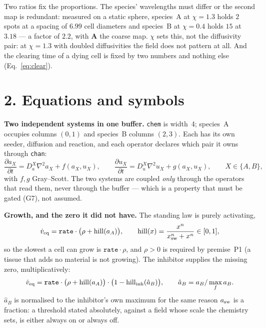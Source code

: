 \documentclass[10pt,a4paper]{article}
\newcommand{\code}[1]{\texttt{#1}}
\begin{document}
Two ratios fix the proportions. The species' wavelengths must differ or the second map is
redundant: measured on a static sphere, species~A at $\chi=1.3$ holds $2$ spots at a spacing of
$6.99$ cell diameters and species~B at $\chi=0.4$ holds $15$ at $3.18$ --- a factor of $2.2$, with
\textbf{A} the coarse map. $\chi$ sets this, not the diffusivity pair: at $\chi=1.3$ with doubled
diffusivities the field does not pattern at all. And the clearing time of a dying cell is fixed by
two numbers and nothing else (Eq.~\eqref{eq:clear}).

\section*{2.\; Equations and symbols}

\textbf{Two independent systems in one buffer.} \code{chem} is width~4; species~A occupies columns
$(0,1)$ and species~B columns $(2,3)$. Each has its own seeder, diffusion and reaction, and each
operator declares which pair it owns through \code{chan}:
%
\begin{equation}
\frac{\partial a_X}{\partial t}=D^X_a\nabla^2 a_X + f(a_X,u_X),\qquad
\frac{\partial u_X}{\partial t}=D^X_u\nabla^2 u_X + g(a_X,u_X),\qquad X\in\{A,B\},
\label{eq:two}
\end{equation}
%
with $f,g$ Gray--Scott. The two systems are coupled \emph{only} through the operators that read
them, never through the buffer --- which is a property that must be gated (G7), not assumed.

\textbf{Growth, and the zero it did not have.} The standing law is purely activating,
%
\begin{equation}
\dot v_{\rm eq}=\texttt{rate}\cdot\bigl(\rho+\mathrm{hill}(a_A)\bigr),\qquad
\mathrm{hill}(x)=\frac{x^{n}}{x_{\rm sw}^{n}+x^{n}}\in[0,1],
\label{eq:growth}
\end{equation}
%
so the slowest a cell can grow is $\texttt{rate}\cdot\rho$, and $\rho>0$ is required by premise~P1
(a tissue that adds no material is not growing). The inhibitor supplies the missing zero,
multiplicatively:
%
\begin{equation}
\dot v_{\rm eq}=\texttt{rate}\cdot\bigl(\rho+\mathrm{hill}(a_A)\bigr)\cdot
\bigl(1-\mathrm{hill}_{\rm inh}(\hat a_B)\bigr),\qquad \hat a_B=a_B/\max_f a_B .
\label{eq:inhib}
\end{equation}
%
$\hat a_B$ is normalised to the inhibitor's own maximum for the same reason $a_{\rm sw}$ is a
fraction: a threshold stated absolutely, against a field whose scale the chemistry sets, is either
always on or always off.
\end{document}
